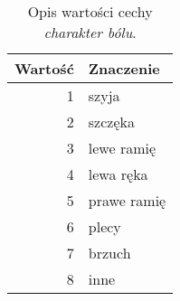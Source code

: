 \begin{table}
    \caption{Opis wartości cechy \textit{charakter bólu}.}\label{tab:cecha_5}
    \begin{tabu}{rX[l]}
        \toprule
        \textbf{Wartość} & \textbf{Znaczenie} \\
        \midrule

        1                & szyja              \\
        2                & szczęka            \\
        3                & lewe ramię         \\
        4                & lewa ręka          \\
        5                & prawe ramię        \\
        6                & plecy              \\
        7                & brzuch             \\
        8                & inne               \\
        \bottomrule
    \end{tabu}
\end{table}

